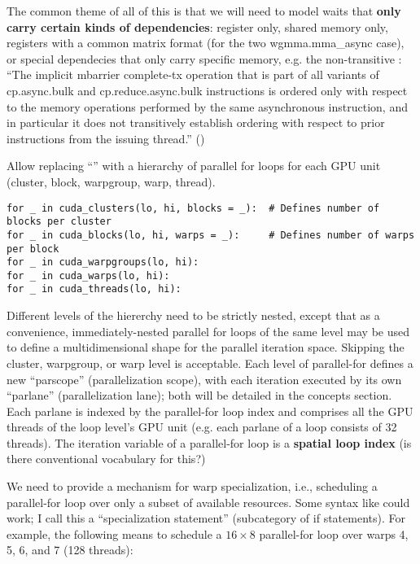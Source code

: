 The common theme of all of this is that we will need to model waits that \textbf{only carry certain kinds of dependencies}: register only, shared memory only, registers with a common matrix format (for the two wgmma.mma\_async case), or special dependecies that only carry specific memory, e.g. the non-transitive \completeTxOperation: ``The implicit mbarrier complete-tx operation that is part of all variants of cp.async.bulk and cp.reduce.async.bulk instructions is ordered only with respect to the memory operations performed by the same asynchronous instruction, and in particular it does not transitively establish ordering with respect to prior instructions from the issuing thread.'' ()

\newpage
{}

 Allow replacing ``'' with a hierarchy of parallel for loops for each GPU unit (cluster, block, warpgroup, warp, thread).

\filbreak
{\color{lightttColor}
\begin{verbatim}
for _ in cuda_clusters(lo, hi, blocks = _):  # Defines number of blocks per cluster
for _ in cuda_blocks(lo, hi, warps = _):     # Defines number of warps per block
for _ in cuda_warpgroups(lo, hi):
for _ in cuda_warps(lo, hi):
for _ in cuda_threads(lo, hi):
\end{verbatim}
}

\filbreak
Different levels of the hiererchy need to be strictly nested, except that as a convenience, immediately-nested parallel for loops of the same level may be used to define a multidimensional shape for the parallel iteration space.
Skipping the cluster, warpgroup, or warp level is acceptable.
Each level of parallel-for defines a new ``parscope'' (parallelization scope), with each iteration executed by its own ``parlane'' (parallelization lane); both will be detailed in the concepts section.
Each parlane is indexed by the parallel-for loop index and comprises all the GPU threads of the loop level's GPU unit (e.g. each parlane of a  loop consists of 32 threads).
The iteration variable of a parallel-for loop is a \textbf{spatial loop index} (is there conventional vocabulary for this?)

\filbreak
{} We need to provide a mechanism for warp specialization, i.e., scheduling a parallel-for loop over only a subset of available resources.
Some syntax like  could work; I call this a ``specialization statement'' (subcategory of if statements).
For example, the following means to schedule a $16 \times 8$ parallel-for loop over warps 4, 5, 6, and 7 (128 threads):

